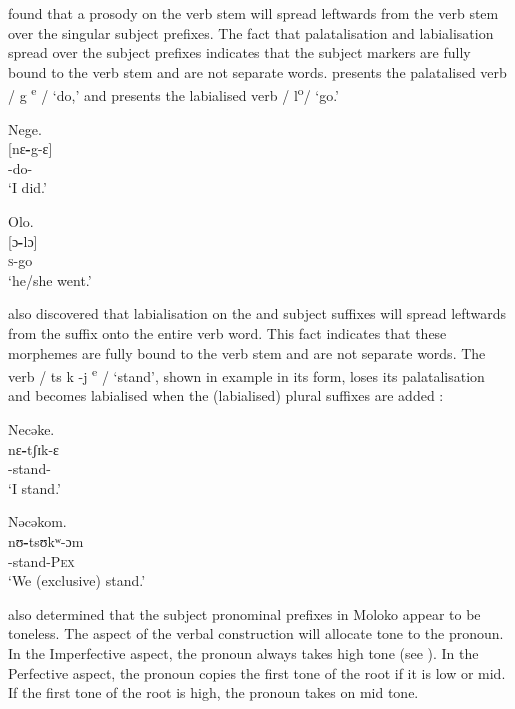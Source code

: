 \largerpage \citet{Bow1997c} found that a prosody on the verb stem will spread leftwards from the verb stem over the singular subject prefixes. The fact that palatalisation and labialisation spread over the subject prefixes indicates that the subject markers are fully bound to the verb stem and are not separate words.  presents the palatalised verb / g\textsuperscript{ e}\textit{ }/ ‘do,’ and  presents the labialised verb / l\textsuperscript{o}/ ‘go.’  

\ea\label{ex:7:11}
Nege.\\
\gll {}[nɛ\textbf{{}-}g-ɛ]\\
{\oneS}-do-{\CL}\\
\glt ‘I did.’
\z

\ea\label{ex:7:12}
Olo.\\
\gll {}[ɔ\textbf{{}-}lɔ]\\
\textsc{s}-go\\
\glt ‘he/she went.’
\z

\citet{Bow1997c} also discovered that labialisation on the {\oneP} and {\twoP} subject suffixes will spread leftwards from the suffix onto the entire verb word. This fact indicates that these morphemes are fully bound to the verb stem and are not separate words.  The verb / ts k -j\textsuperscript{ e }/ ‘stand’, shown in example  in its {\oneS} form, loses its palatalisation and becomes labialised when the (labialised) plural suffixes are added :

\ea\label{ex:7:13}
Necəke.\\
\gll nɛ\textbf{{}-}tʃɪk-ɛ\\
{\oneS}-stand-{\CL}    \\
\glt ‘I stand.’
\z

\ea\label{ex:7:14}
Nəcəkom.    \\
\gll nʊ\textbf{{}-}tsʊkʷ{}-ɔm\\
-stand-\textsc{Pex}\\
\glt ‘We (exclusive) stand.’
\z

\citet{Bow1997c} also determined that the subject pronominal prefixes in Moloko appear to be toneless. The aspect of the verbal construction will allocate tone to the pronoun.   In the Imperfective aspect, the pronoun always takes high tone (see ).  In the Perfective aspect, the pronoun copies the first tone of the root if it is low or mid.  If the first tone of the root is high, the pronoun takes on mid tone.

